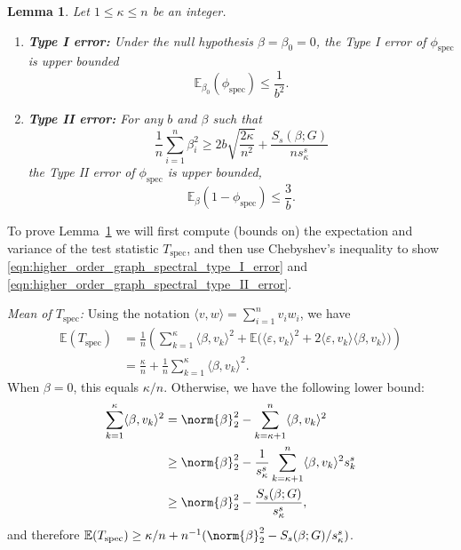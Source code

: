 \documentclass{article}
\newcommand{\1}{\mathbf{1}}
\newcommand{\Ebb}{\mathbb{E}}
\newcommand{\dotp}[2]{\langle #1, #2 \rangle}
\newcommand{\spec}{\mathrm{spec}}
\theoremstyle{alden}
\theoremstyle{aldenthm}
\newtheorem{lemma}{Lemma}
\theoremstyle{definition}
\theoremstyle{remark}
\begin{document}
\begin{lemma}
	\label{lem:higher_order_fixed_graph_testing}
	Let $1 \leq \kappa \leq n$ be an integer.
	\begin{enumerate}
		\item \textbf{Type I error:} Under the null hypothesis $\beta = \beta_0 = 0$, the Type I error of $\phi_{\spec}$ is upper bounded
		\begin{equation}
		\label{eqn:higher_order_graph_spectral_type_I_error}
		\mathbb{E}_{\beta_0}(\phi_{\spec}) \leq \frac{1}{b^2}.
		\end{equation}
		\item \textbf{Type II error:} For any $b$ and $\beta$ such that
		\begin{equation}
		\label{eqn:higher_order_fixed_graph_testing_critical_radius}
		\frac{1}{n} \sum_{i = 1}^{n} \beta_i^2 \geq 2b\sqrt{\frac{2\kappa}{n^2}} + \frac{S_s(\beta;G)}{ns_{\kappa}^s}
		\end{equation}
		the Type II error of $\phi_{\spec}$ is upper bounded,
		\begin{equation}
		\label{eqn:higher_order_graph_spectral_type_II_error}
		\mathbb{E}_{\beta}(1 - \phi_{\spec}) \leq \frac{3}{b}.
		\end{equation}
	\end{enumerate}
\end{lemma}

To prove Lemma~\ref{lem:higher_order_fixed_graph_testing} we will first compute (bounds on) the expectation and variance of the test statistic $T_{\mathrm{spec}}$, and then use Chebyshev's inequality to show \eqref{eqn:higher_order_graph_spectral_type_I_error} and \eqref{eqn:higher_order_graph_spectral_type_II_error}.

\vspace{.2 in}

\textit{Mean of $T_{\mathrm{spec}}$:} Using the notation $\dotp{v}{w} = \sum_{i = 1}^{n} v_iw_i$, we have
\begin{align*}
\Ebb(T_{\spec}) & = \frac{1}{n}\left(\sum_{k = 1}^{\kappa} \dotp{\beta}{v_k}^2 + \Ebb\bigl( \dotp{\varepsilon}{v_k}^2 + 2 \dotp{\varepsilon}{v_k} \dotp{\beta}{v_k}\bigr)\right) \\
& = \frac{\kappa}{n} + \frac{1}{n}\sum_{k = 1}^{\kappa}\dotp{\beta}{v_k}^2.
\end{align*}
When $\beta = 0$, this equals $\kappa/n$. Otherwise, we have the following lower bound:
\begin{align*}
\sum_{k = 1}^{\kappa}\dotp{\beta}{v_k}^2 & = \norm{\beta}_2^2 - \sum_{k = \kappa + 1}^{n} \dotp{\beta}{v_k}^2 \\
& \geq \norm{\beta}_2^2 - \frac{1}{s_{\kappa}^s}\sum_{k = \kappa + 1}^{n} \dotp{\beta}{v_k}^2 s_k^s \\
& \geq \norm{\beta}_2^2 - \frac{S_s(\beta;G)}{s_{\kappa}^s},
\end{align*}
and therefore $\Ebb(T_{\spec}) \geq \kappa/n + n^{-1}(\norm{\beta}_2^2 - S_s(\beta;G)/s_{\kappa}^s)$. 
\end{document}
